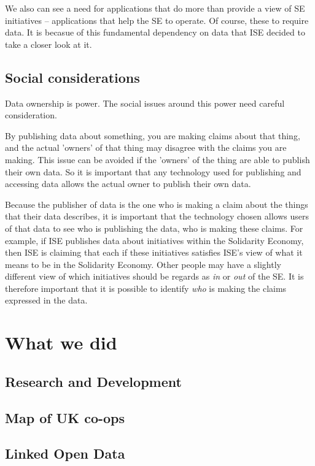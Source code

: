 \documentclass[11pt,twoside,a4paper]{article}
\begin{document}
We also can see a need for applications that do more than provide a view of SE initiatives -- applications that help the SE to operate.
Of course, these to require data.
It is becasue of this fundamental dependency on data that ISE decided to take a closer look at it.

\subsection*{Social considerations}
Data ownership is power. The social issues around this power need careful consideration.

By publishing data about something, you are making claims about that thing, and the actual 'owners' of that thing may disagree with the claims you are making.
This issue can be avoided if the 'owners' of the thing are able to publish their own data.
So it is important that any technology used for publishing and accessing data allows the actual owner to publish their own data.

Because the publisher of data is the one who is making a claim about the things that their data describes,
it is important that the technology chosen allows users of that data to see who is publishing the data, who is making these claims.
For example, if ISE publishes data about initiatives within the Solidarity Economy, 
then ISE is claiming that each if these initiatives satisfies ISE's view of what it means to be in the Solidarity Economy.
Other people may have a slightly different view of which initiatives should be regards as \textit{in} or \textit{out} of the SE.
It is therefore important that it is possible to identify \textit{who} is making the claims expressed in the data.

\section*{What we did}
\subsection*{Research and Development}
\subsection*{Map of UK co-ops}
\subsection*{Linked Open Data}
\end{document}

